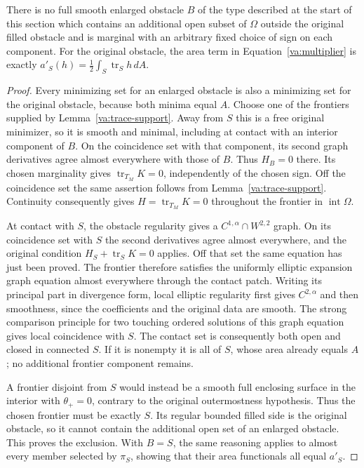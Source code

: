 \begin{proposition}
\label{va:enlarged-obstacle}
There is no full smooth enlarged obstacle \(B\) of the type described at
the start of this section which contains an additional open subset of
\(\Omega\) outside the original filled obstacle and is marginal with
an arbitrary fixed choice of sign on each component.  For the original
obstacle, the area term in Equation~\eqref{va:multiplier} is exactly
\(a'_S(h)=\tfrac12\int_S\operatorname{tr}_S h\,dA\).
\end{proposition}
\begin{proof}
Every minimizing set for an enlarged obstacle is also a minimizing set
for the original obstacle, because both minima equal \(A\).  Choose one
of the frontiers supplied by Lemma~\ref{va:trace-support}.  Away from
\(S\) this is a free original minimizer, so it is smooth and minimal,
including at contact with an interior component of \(B\).  On the
coincidence set with that component, its second graph derivatives agree
almost everywhere with those of \(B\).  Thus \(H_B=0\) there.  Its
chosen marginality gives \(\operatorname{tr}_{T_M}K=0\), independently
of the chosen sign.  Off the coincidence set the same assertion follows
from Lemma~\ref{va:trace-support}.  Continuity consequently gives
\(H=\operatorname{tr}_{T_M}K=0\) throughout the frontier in
\(\operatorname{int}\Omega\).

At contact with \(S\), the obstacle regularity gives a
\(C^{1,\alpha}\cap W^{2,2}\) graph.  On its coincidence set with \(S\)
the second derivatives agree almost everywhere, and the original
condition \(H_S+\operatorname{tr}_S K=0\) applies.  Off that set the
same equation has just been proved.  The frontier therefore satisfies
the uniformly elliptic expansion graph equation almost everywhere
through the contact patch.  Writing its principal part in divergence
form, local elliptic regularity first gives \(C^{2,\alpha}\) and then
smoothness, since the coefficients and the original data are smooth.
The strong comparison principle for two touching ordered solutions of
this graph equation gives local coincidence with \(S\).  The contact
set is consequently both open and closed in connected \(S\).  If it is
nonempty it is all of \(S\), whose area already equals \(A\); no
additional frontier component remains.

A frontier disjoint from \(S\) would instead be a smooth full enclosing
surface in the interior with \(\theta_+=0\), contrary to the original
outermostness hypothesis.  Thus the chosen frontier must be exactly
\(S\).  Its regular bounded filled side is the original obstacle, so
it cannot contain the additional open set of an enlarged obstacle.
This proves the exclusion.  With \(B=S\), the same reasoning applies
to almost every member selected by \(\pi_S\), showing that their area
functionals all equal \(a'_S\).
\end{proof}

